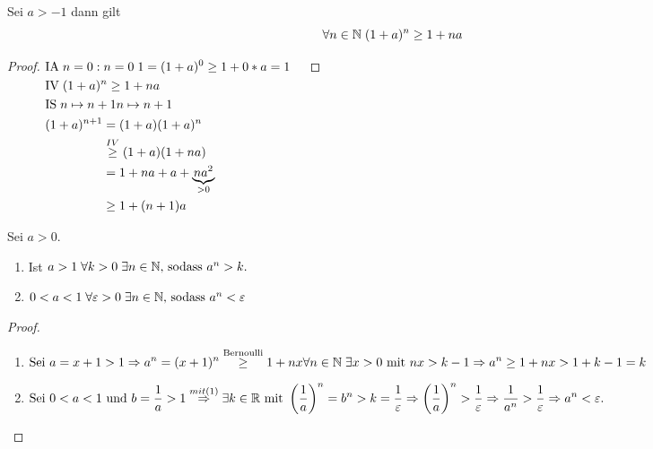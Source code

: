 \documentclass[a4paper,titlepage,oneside]{article}
\def\N{\ensuremath{\mathbb{N}} }
\def\R{\ensuremath{\mathbb{R}} }
\renewcommand{\epsilon}{\ensuremath{\varepsilon} }
\newcommand{\IA}[1][n=0]{\vspace{0.1pt}\ensuremath{\text{IA}\sp#1:}}
\newcommand{\IV}{\vspace{0.1pt}\ensuremath{\text{IV}\sp}}
\newcommand{\IS}[1][n \mapsto n+1]{\vspace{0.1pt}\ensuremath{\text{IS}\sp#1}}
\def\fa{\ensuremath{\forall}}
\def\sp{\hspace{0,1cm}}
\theoremstyle{thmstyle}
\begin{document}
\begin{subsatz}
Sei \(a > -1\) dann gilt \[\fa n \in \N \sp (1+a)^n \ge 1 + na \]
\begin{proof}
\begin{math}
\begin{aligned}[t]
	&\IA{n=0} \sp 1 = (1 + a)^0 \ge 1 + 0*a = 1					&&\\
	&\IV (1+a)^n \ge 1 + na								&&\\
	&\IS{n \mapsto n+1} \\
	&\begin{aligned}[t]
		(1+a)^{n+1} 	&= (1+a)(1+a)^n 					&&\\
					&\overset{IV}{\ge} (1 + a)(1 + na) 		&&\\
					&= 1 + na + a + \underbrace{na^2}_{> 0} 	&&\\
					&\ge 1 + (n+1)a \end{aligned}
\end{aligned}\\
\end{math}
\end{proof}
\end{subsatz}
\newpage

\begin{subkorr}
Sei \(a > 0\).
\begin{enumerate}[label=(\arabic*)]
	\item Ist \sp \(a > 1 \sp \forall k > 0 \sp \exists n \in \N \text{, sodass }a^n > k.\)
	\item \(0 < a < 1 \sp \forall \epsilon > 0 \sp \exists n \in \N \text{, sodass }a^n < \epsilon\)
\end{enumerate}
\begin{proof}\sp
\begin{enumerate}[label=(\arabic*)]
	\item \begin{math} \displaystyle
		\text{Sei } a = x + 1 > 1 \Rightarrow a^n = (x + 1)^n \overset{\text{Bernoulli}}{\ge} 1 + nx \\
		\forall n \in \N \sp \exists x > 0 \text{ mit } nx > k - 1 \Rightarrow a^n \ge 1 + nx > 1 + k -1 = k
		\end{math}
	\item \begin{math} \displaystyle
		\text{Sei } 0 < a < 1 \text{ und } b = \frac{1}{a} > 1 \overset{\tiny{mit (1)}}{\Rightarrow} \exists k \in \R \text{ mit }  \left(\frac{1}{a}\right)^n = b^n > k = \frac{1}{\epsilon}\\
		\Rightarrow  \left(\frac{1}{a}\right)^n > \frac{1}{\epsilon} \Rightarrow  \frac{1}{a^n} > \frac{1}{\epsilon} \Rightarrow a^n < \epsilon.
		\end{math}
\end{enumerate}
\end{proof}
\end{subkorr}
\end{document}
